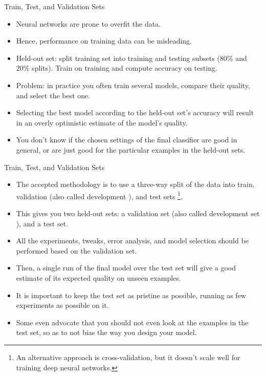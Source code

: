 \documentclass[handout]{beamer}
\begin{document}
\begin{frame}{Train, Test, and Validation Sets}
\begin{scriptsize}
\begin{itemize}
\item Neural networks are prone to overfit the data.
\item Hence, performance on training data can be misleading.
\item Held-out set: split training set into training and testing subsets (80\% and 20\% splits). Train on training and compute accuracy on testing.
\item Problem: in practice you often train several models, compare their quality, and select the best one. 
\item Selecting the best model according to the held-out set's accuracy will result in an overly optimistic estimate of the model's quality.
\item You don't know if the chosen settings of the final classifier are good in general, or are just good for the particular examples in the held-out sets.

\end{itemize}
\end{scriptsize}
\end{frame}


\begin{frame}{Train, Test, and Validation Sets}
\begin{scriptsize}
\begin{itemize}
\item The accepted methodology is to use a three-way split of the data into train, validation (also called development ), and test sets \footnote{An alternative approach is cross-validation, but it doesn't scale well for training deep neural networks.}. 
\item This gives you two held-out sets: a validation set (also called development set ), and a test set.
\item All the experiments, tweaks, error analysis, and model selection should be performed based on the validation set. 
\item Then, a single run of the final model over the test set will give a good estimate of its expected quality on unseen examples. 
\item It is important to keep the test set as pristine as possible, running as few experiments as possible on it. 
\item Some even advocate that you should not even look at the examples in the test
set, so as to not bias the way you design your model.



\end{itemize}

\end{scriptsize}
\end{frame}
\end{document}
